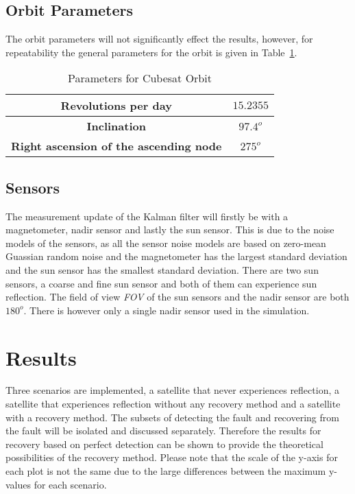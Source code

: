 \documentclass[letterpaper, 10 pt, conference]{ieeeconf}  %
\begin{document}

\subsection{Orbit Parameters}
The orbit parameters will not significantly effect the results, however, for repeatability the general parameters for the orbit is given in Table~\ref{Table:OrbitParameters}. 
	
\begin{table}[!htb]
	\caption{\label{Table:OrbitParameters}Parameters for Cubesat Orbit}
	\begin{tabular}{|c|c|}
		\hline
		\textbf{Revolutions per day}          & $15.2355$                    \\ \hline
		\textbf{Inclination}          & $97.4^o$                    \\ \hline
		\textbf{Right ascension of the ascending node} & $275^o$ \\ \hline
	\end{tabular}
\end{table}

\subsection{Sensors}
The measurement update of the Kalman filter will firstly be with a magnetometer, nadir sensor and lastly the sun sensor. This is due to the noise models of the sensors, as all the sensor noise models are based on zero-mean Guassian random noise and the magnetometer has the largest standard deviation and the sun sensor has the smallest standard deviation. There are two sun sensors, a coarse and fine sun sensor and both of them can experience sun reflection. The field of view \emph{FOV} of the sun sensors and the nadir sensor are both $180^o$. There is however only a single nadir sensor used in the simulation.

\section{Results}
\label{section:Results}
Three scenarios are implemented, a satellite that never experiences reflection, a satellite that experiences reflection without any recovery method and a satellite with a recovery method. The subsets of detecting the fault and recovering from the fault will be isolated and discussed separately. Therefore the results for recovery based on perfect detection can be shown to provide the theoretical possibilities of the recovery method. Please note that the scale of the y-axis for each plot is not the same due to the large differences between the maximum y-values for each scenario.
\end{document}
